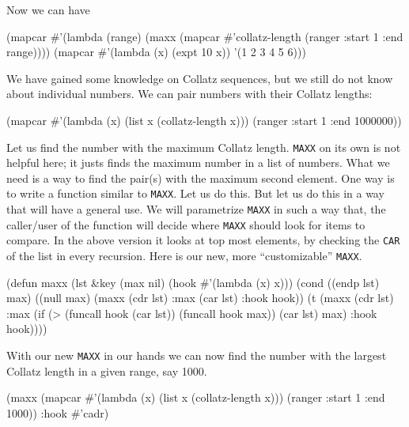 \documentclass[a4paper,11pt]{article}
\begin{document}
\begin{uenum}
Now we can have

\begin{lispcode}
(mapcar #'(lambda (range) 
			(maxx (mapcar #'collatz-length 
						  (ranger :start 1 :end range)))) 
		(mapcar #'(lambda (x) 
					(expt 10 x)) '(1 2 3 4 5 6)))
\end{lispcode}


\item We have gained some knowledge on Collatz sequences, but we still do not know about individual numbers. We can pair numbers with their Collatz lengths:

\begin{lispcode}
(mapcar #'(lambda (x) (list x (collatz-length x))) 
	(ranger :start 1 :end 1000000))
\end{lispcode}

\item Let us find the number with the maximum Collatz length. \Verb+MAXX+ on its own is not helpful here; it justs finds the maximum number in a list of numbers. What we need is a way to find the pair(s) with the maximum second element. One way is to write a function similar to \Verb+MAXX+. Let us do this. But let us do this in a way that will have a general use. We will parametrize \Verb+MAXX+ in such a way that, the caller/user of the function will decide where \Verb+MAXX+ should look for items to compare. In the above version it looks at top most elements, by checking the \Verb+CAR+ of the list in every recursion. Here is our new, more ``customizable'' \Verb+MAXX+. 

\begin{lispcode}
(defun maxx (lst &key 
				 (max nil)
				 (hook #'(lambda (x) x)))
  (cond ((endp lst) max)
		((null max) (maxx (cdr lst) :max (car lst) :hook hook))
		(t (maxx 
			 (cdr lst)
			 :max (if (> (funcall hook (car lst)) 
						 (funcall hook max))
					(car lst)
					max)
			 :hook hook))))
\end{lispcode}

\item With our new \Verb+MAXX+ in our hands we can now find the number with the largest Collatz length in a given range, say 1000.

\begin{lispcode}
(maxx (mapcar #'(lambda (x) 
				  (list x (collatz-length x))) 
			  (ranger :start 1 :end 1000)) :hook #'cadr)
\end{lispcode}


\end{uenum}
\end{document}

